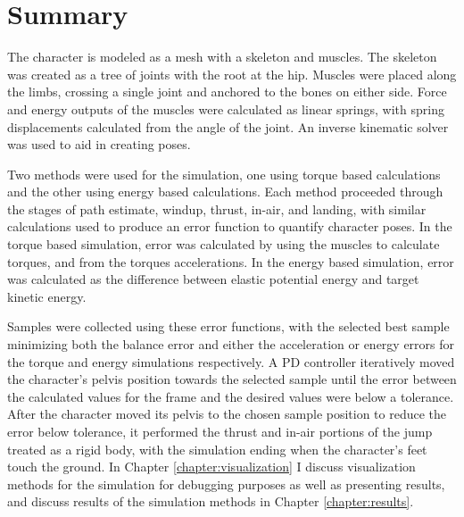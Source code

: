 \section{Summary}
\label{subsection:animation_summary}
The character is modeled as a mesh with a skeleton and muscles.   The skeleton was created as a tree of joints with the root at the hip.  Muscles were placed along the limbs, crossing a single joint and anchored to the bones on either side.  Force and energy outputs of the muscles were calculated as linear springs, with spring displacements calculated from the angle of the joint.  An inverse kinematic solver was used to aid in creating poses.

Two methods were used for the simulation, one using torque based calculations and the other using energy based calculations.  Each method proceeded through the stages of path estimate, windup, thrust, in-air, and landing, with similar calculations used to produce an error function to quantify character poses.  In the torque based simulation, error was calculated by using the muscles to calculate torques, and from the torques accelerations.  In the energy based simulation, error was calculated as the difference between elastic potential energy and target kinetic energy.  

Samples were collected using these error functions, with the selected best sample minimizing both the balance error and either the acceleration or energy errors for the torque and energy simulations respectively.  A PD controller iteratively moved the character's pelvis position towards the selected sample until the error between the calculated values for the frame and the desired values were below a tolerance.  After the character moved its pelvis to the chosen sample position to reduce the error below tolerance, it performed the thrust and in-air portions of the jump treated as a rigid body, with the simulation ending when the character's feet touch the ground.  In Chapter \ref{chapter:visualization} I discuss visualization methods for the simulation for debugging purposes as well as presenting results, and discuss results of the simulation methods in Chapter \ref{chapter:results}.